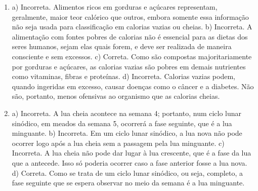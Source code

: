 \begin{enumerate}
\item
a) Incorreta. Alimentos ricos em gorduras e açúcares representam,
geralmente, maior teor calórico que outros, embora somente essa
informação não seja usada para classificação em calorias vazias ou
cheias.
b) Incorreta. A alimentação com fontes pobres de calorias não é
essencial para as dietas dos seres humanos, sejam elas quais forem, e
deve ser realizada de maneira consciente e sem excessos.
c) Correta. Como são compostas majoritariamente por gorduras e açúcares,
as calorias vazias são pobres em demais nutrientes como vitaminas,
fibras e proteínas.
d) Incorreta. Calorias vazias podem, quando ingeridas em excesso, causar
doenças como o câncer e a diabetes. Não são, portanto, menos ofensivas
ao organismo que as calorias cheias.

\item
a) Incorreta. A lua cheia acontece na semana 4; portanto, num ciclo
lunar sinódico, em meados da semana 5, ocorrerá a fase seguinte, que é a
lua minguante.
b) Incorreta. Em um ciclo lunar sinódico, a lua nova não pode ocorrer
logo após a lua cheia sem a passagem pela lua minguante.
c) Incorreta. A lua cheia não pode dar lugar à lua crescente, que é a
fase da lua que a antecede. Isso só poderia ocorrer caso a fase anterior
fosse a lua nova.
d) Correta. Como se trata de um ciclo lunar sinódico, ou seja, completo,
a fase seguinte que se espera observar no meio da semana é a lua
minguante.
\end{enumerate}


